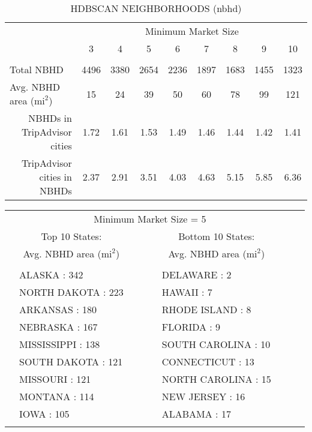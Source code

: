 \begin{table}[!htbp] \centering 
  \caption{HDBSCAN NEIGHBORHOODS (nbhd)} 
  \label{tab:hdbscan2} 
\begin{tabular}{@{\extracolsep{5pt}}llccclccc} 
\\[-1.8ex]\hline 
& \multicolumn{8}{c}{Minimum Market Size} \\ 
\cline{2-9}
& \multicolumn{1}{c}{3} & 4 & 5 & 6 &  \multicolumn{1}{c}{7} &8 & 9 & 10\\ 
\hline \\[-1.8ex] 
Total NBHD & \multicolumn{1}{c}{4496}	& 3380	& 2654	& 2236	&  \multicolumn{1}{c}{1897}	& 1683	& 1455	& 1323\\
Avg. NBHD area ($\text{mi}^2$)   & \multicolumn{1}{c}{15}	& 24	& 39	& 50	&  \multicolumn{1}{c}{60}	& 78	& 99	& 121 \\
\multicolumn{1}{r}{NBHDs in TripAdvisor cities} & \multicolumn{1}{c}{1.72}	&1.61	&1.53	&1.49	&  \multicolumn{1}{c}{1.46}	&1.44	&1.42	&1.41\\
\multicolumn{1}{r}{TripAdvisor cities in NBHDs}  & \multicolumn{1}{c}{2.37}	&2.91	&3.51	&4.03	& \multicolumn{1}{c}{4.63}	&5.15	&5.85	&6.36\\
\hline 
\end{tabular}
\end{table} 
\begin{table}[!htbp] \centering 
\begin{tabular}{@{\extracolsep{5pt}}llccclccc} 
\hline 
& \multicolumn{6}{c}{Minimum Market Size = 5} \\ 
& \multicolumn{1}{c}{Top 10 States:} & \multicolumn{7}{c}{Bottom 10 States:} \\
& \multicolumn{1}{c}{Avg. NBHD area ($\text{mi}^2$)} & & & \multicolumn{3}{c}{Avg. NBHD area ($\text{mi}^2$)} \\
\hline  
\\[-1.8ex]
 & ALASKA	:	342	&	&	&	&	DELAWARE	:	2	& 	& 	& \\
 & NORTH DAKOTA	:	223	&	&	&	&	HAWAII	:	7	& 	& 	& \\
 & ARKANSAS	:	180	&	&	&	&	RHODE ISLAND	:	8	& 	& 	& \\
 & NEBRASKA	:	167	&	&	&	&	FLORIDA	:	9	& 	& 	& \\
 & MISSISSIPPI	:	138	&	&	&	&	SOUTH CAROLINA	:	10	& 	& 	& \\
 & SOUTH DAKOTA	:	121	&	&	&	&	CONNECTICUT	:	13	& 	& 	& \\
 & MISSOURI	:	121	&	&	&	&	NORTH CAROLINA	:	15	& 	& 	& \\
 & MONTANA	:	114	&	&	&	&	NEW JERSEY	:	16	& 	& 	& \\
 & IOWA	:	105	&	&	&	&	ALABAMA	:	17	& 	& 	& \\
\hline \\[-1.8ex] 
\end{tabular} 
\end{table} 